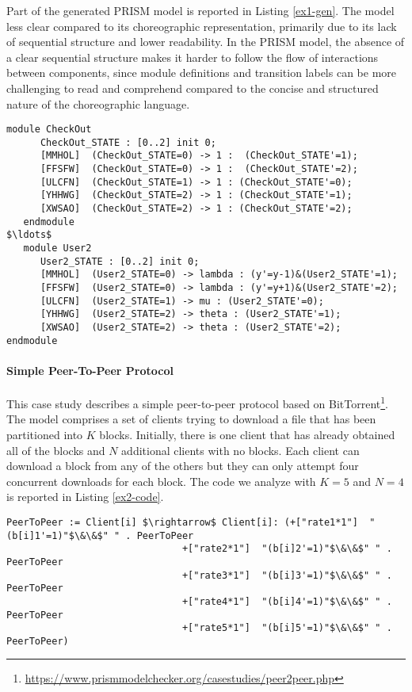  Part of the generated PRISM model is reported in Listing \ref{ex1-gen}. 
The model less clear compared to its
choreographic representation, primarily due to its lack of sequential
structure and lower readability.  In the PRISM model, the absence of a
clear sequential structure makes it harder to follow the flow of
interactions between components, 
since module definitions and transition labels can be more challenging
to read and comprehend compared to the concise and structured nature
of the choreographic language.\newpage
\begin{lstlisting}[style=prism-color,caption={Part of the generated PRISM model for the Modified thinkteam Protocol},captionpos=b,label={ex1-gen}]
   module CheckOut
      CheckOut_STATE : [0..2] init 0;
      [MMHOL]  (CheckOut_STATE=0) -> 1 :  (CheckOut_STATE'=1);
      [FFSFW]  (CheckOut_STATE=0) -> 1 :  (CheckOut_STATE'=2);
      [ULCFN]  (CheckOut_STATE=1) -> 1 : (CheckOut_STATE'=0);
      [YHHWG]  (CheckOut_STATE=2) -> 1 : (CheckOut_STATE'=1);
      [XWSAO]  (CheckOut_STATE=2) -> 1 : (CheckOut_STATE'=2);
   endmodule
$\ldots$
   module User2
      User2_STATE : [0..2] init 0;
      [MMHOL]  (User2_STATE=0) -> lambda : (y'=y-1)&(User2_STATE'=1);
      [FFSFW]  (User2_STATE=0) -> lambda : (y'=y+1)&(User2_STATE'=2);
      [ULCFN]  (User2_STATE=1) -> mu : (User2_STATE'=0);
      [YHHWG]  (User2_STATE=2) -> theta : (User2_STATE'=1);
      [XWSAO]  (User2_STATE=2) -> theta : (User2_STATE'=2);
endmodule
\end{lstlisting}


\paragraph{Simple Peer-To-Peer Protocol}
This case study describes a simple peer-to-peer protocol based on BitTorrent\footnote{\url{https://www.prismmodelchecker.org/casestudies/peer2peer.php}}. The model comprises a set of clients trying to download a file that has been partitioned into $K$ blocks. Initially, there is one client that has already obtained all of the blocks and $N$ additional clients with no blocks. Each client can download a block from any of the others but they can only attempt four concurrent downloads for each block. The code we analyze with $K=5$ and $N=4$ is reported in Listing \ref{ex2-code}.
\begin{lstlisting}[style=chor-color,caption={Choreography for the Peer-To-Peer Protocol},captionpos=b,label={ex2-code}]
PeerToPeer := Client[i] $\rightarrow$ Client[i]: (+["rate1*1"]  "(b[i]1'=1)"$\&\&$" " . PeerToPeer
			                   +["rate2*1"]  "(b[i]2'=1)"$\&\&$" " . PeerToPeer
			                   +["rate3*1"]  "(b[i]3'=1)"$\&\&$" " . PeerToPeer
			                   +["rate4*1"]  "(b[i]4'=1)"$\&\&$" " . PeerToPeer
			                   +["rate5*1"]  "(b[i]5'=1)"$\&\&$" " . PeerToPeer)
\end{lstlisting} 

